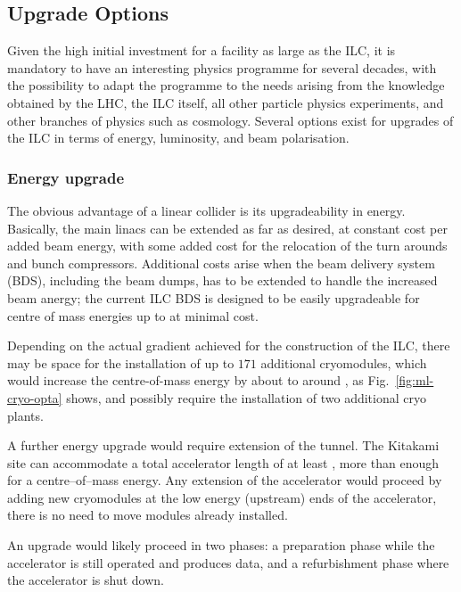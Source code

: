
\subsection{Upgrade Options \label{subsec:upg-opt}}

Given the high initial investment for a facility as large as the ILC, it is mandatory to have an interesting physics programme for several decades, with the possibility to adapt the programme to the needs arising from the knowledge obtained by the LHC, the ILC itself, all other particle physics experiments, and other branches of physics such as cosmology.
Several options exist for upgrades of the ILC in terms of energy, luminosity, and beam polarisation.

\subsubsection{Energy upgrade}
\label{subsubsec:upg-optE}

The obvious advantage of a linear collider is its upgradeability in energy.
Basically, the main linacs can be extended as far as desired, at constant cost per added beam energy, with some added cost for the relocation of the turn arounds and bunch compressors.
Additional costs arise when the beam delivery system (BDS), including the beam dumps, has to be extended to handle the increased beam anergy; 
the current ILC BDS is designed to be easily upgradeable for centre of mass energies up to  at minimal cost.

Depending on the actual gradient achieved for the construction of the ILC, there may be space for the installation of up to $171$ additional cryomodules, which would increase the centre-of-mass energy by about  to around , as Fig.~\ref{fig:ml-cryo-opta} shows, 
and possibly require the installation of two additional cryo plants.

A further energy upgrade would require extension of the tunnel.
The Kitakami site can accommodate a total accelerator length of at least , more than enough for a  centre--of--mass energy.
Any extension of the accelerator would proceed by adding new cryomodules at the low energy (upstream) ends of the accelerator, there is no need to move modules already installed. 

An upgrade would likely proceed in two phases: a preparation phase while the accelerator is still operated and produces data, and a refurbishment phase where the accelerator is shut down.


